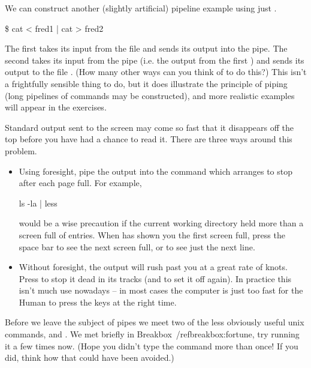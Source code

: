 We can construct another (slightly artificial) pipeline example using
just .

\begin{ttoutenv}
\$  cat < fred1 | cat > fred2
\end{ttoutenv}
The first  takes its input from the file
 and sends its output into the pipe. The second
 takes its input from the pipe (i.e. the output from the
first ) and sends its output to the file . (How many
other ways can you think of to do this?)  This isn't a frightfully sensible
thing to do, but it does illustrate the principle of piping (long
pipelines of commands may be constructed), and more realistic examples
will appear in the exercises.

Standard output sent to the screen may come so fast that it
disappears off the top before you have had a chance to read it.
There are three ways around this problem.
\begin{itemize}
\item Using foresight, pipe the output into the command 
  which arranges to stop after each page full. For example,
  \begin{ttoutenv}
  ls -la | less
  \end{ttoutenv}
  would be a wise precaution if the current working directory held
  more than a screen full of entries. When  has shown you the
  first screen full, press the space bar to see the next screen full,
  or  to see just the next line.
\item 
  Without foresight, the output will rush past you at a great rate
  of knots. Press  to stop it dead in its tracks
  (and  to set it off again).
  In practice this isn't much use nowadays -- in most cases the computer is
  just too fast for the Human to press the keys at the right time.
\end{itemize}
%
%
%
%
Before we leave the subject of pipes we meet two of the less obviously useful unix commands,  and . We met  briefly in Breakbox~/ref{breakbox:fortune}, try running it a few times now. (Hope you didn't type the command more than once! If you did, think how that could have been avoided.)

